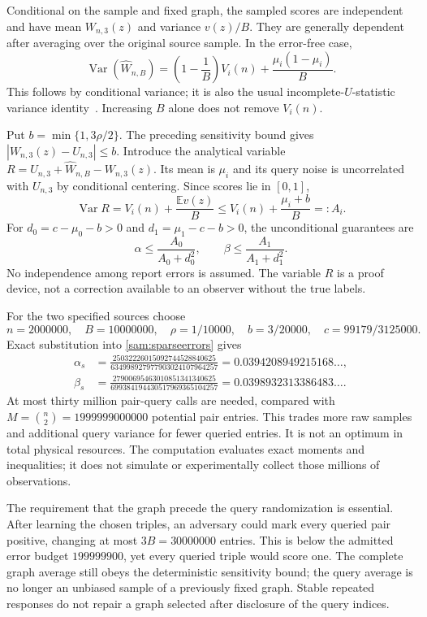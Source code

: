 Conditional on the sample and fixed graph, the sampled scores are independent and have mean $W_{n,3}(z)$ and variance $v(z)/B$. They are generally dependent after averaging over the original source sample. In the error-free case,
\[
 \operatorname{Var}(\widehat W_{n,B})=\left(1-\frac1B\right)V_i(n)+\frac{\mu_i(1-\mu_i)}B.
\]
This follows by conditional variance; it is also the usual incomplete-$U$-statistic variance identity~\cite{clemencon}. Increasing $B$ alone does not remove $V_i(n)$.

Put $b=\min\{1,3\rho/2\}$. The preceding sensitivity bound gives
$|W_{n,3}(z)-U_{n,3}|\le b$. Introduce the analytical variable
$R=U_{n,3}+\widehat W_{n,B}-W_{n,3}(z)$.
Its mean is $\mu_i$ and its query noise is uncorrelated with $U_{n,3}$ by conditional centering. Since scores lie in $[0,1]$,
\[
 \operatorname{Var}R=V_i(n)+\frac{\mathbb Ev(z)}B
 \le V_i(n)+\frac{\mu_i+b}B=:A_i.
\]
For $d_0=c-\mu_0-b>0$ and $d_1=\mu_1-c-b>0$, the unconditional guarantees are
\begin{equation}
 \alpha\le\frac{A_0}{A_0+d_0^2},\qquad
 \beta\le\frac{A_1}{A_1+d_1^2}.
 \label{sam:sparseerrors}
\end{equation}
No independence among report errors is assumed. The variable $R$ is a proof device, not a correction available to an observer without the true labels.

For the two specified sources choose
\[
 n=2000000,\quad B=10000000,\quad\rho=1/10000,\quad
 b=3/20000,\quad c=99179/3125000.
\]
Exact substitution into \eqref{sam:sparseerrors} gives
\begin{align*}
 \alpha_s&=\frac{25032226015092744528840625}{634998927977903024107964257}
 =0.0394208949215168\ldots,\\
 \beta_s&=\frac{27900695463010851341340625}{699384194430517969365104257}
 =0.0398932313386483\ldots.
\end{align*}
At most thirty million pair-query calls are needed, compared with
$M=\binom n2=1999999000000$ potential pair entries. This trades more raw samples and additional query variance for fewer queried entries. It is not an optimum in total physical resources. The computation evaluates exact moments and inequalities; it does not simulate or experimentally collect those millions of observations.

The requirement that the graph precede the query randomization is essential. After learning the chosen triples, an adversary could mark every queried pair positive, changing at most $3B=30000000$ entries. This is below the admitted error budget $199999900$, yet every queried triple would score one. The complete graph average still obeys the deterministic sensitivity bound; the query average is no longer an unbiased sample of a previously fixed graph. Stable repeated responses do not repair a graph selected after disclosure of the query indices.


